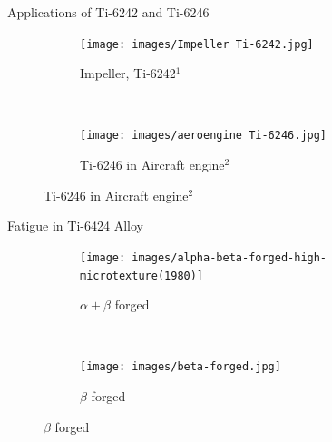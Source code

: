 \documentclass[10pt]{beamer}
\begin{document}
{%
\begin{frame}[fragile]{Applications of Ti-6242 and Ti-6246}

\begin{figure}[H]
    \centering
    \begin{subfigure}{0.35\textwidth}
        \texttt{[image: images/Impeller Ti-6242.jpg]}
        \caption{Impeller, Ti-6242$^{1}$}
        \end{subfigure}
    ~
    \begin{subfigure}{0.45\textwidth}
        \texttt{[image: images/aeroengine Ti-6246.jpg]}
        \caption{Ti-6246 in Aircraft engine$^{2}$}
    \end{subfigure}
      
\end{figure}

\end{frame}
}

{%
\begin{frame}[fragile]{Fatigue in Ti-6424 Alloy}

\begin{figure}[H]
    \centering
    \begin{subfigure}{0.40\textwidth}
        \texttt{[image: images/alpha-beta-forged-high-microtexture(1980)]}
        \caption{\tiny  $\alpha+\beta$ forged}
        \label{fig:Ti-6242 Surface}
    \end{subfigure}
    ~
    \begin{subfigure}{0.40\textwidth}
        \texttt{[image: images/beta-forged.jpg]}
        \caption{\tiny $\beta$ forged}
        \label{fig:Ti-6242 Surface}
    \end{subfigure}  
\end{figure}      

\vspace{-10mm}  
  
\begin{table}[]
\end{table}
    
\end{frame}
}
\end{document}
